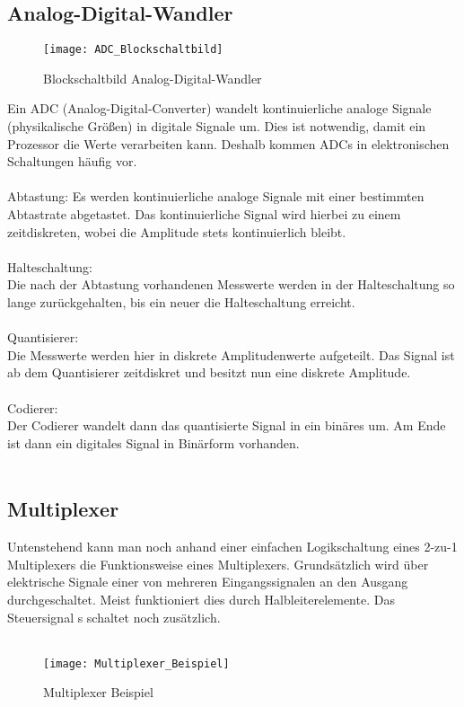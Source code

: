 \documentclass[titlepage,12pt,twoside]{article}
\begin{document}
\subsection{Analog-Digital-Wandler}
\label{chap:Analog-Digital-Wandler}
\begin{figure}[H]
	\begin{center}
		\scalebox{1.2}
		{\texttt{[image: ADC\_Blockschaltbild]}}
		\caption{Blockschaltbild Analog-Digital-Wandler}
		\label{fig:ADC_Blockschaltbild}
	\end{center}
\end{figure}
\hfill \break
Ein ADC (Analog-Digital-Converter) wandelt kontinuierliche analoge Signale 
(physikalische Größen) in digitale Signale um. Dies ist notwendig, damit ein 
Prozessor die Werte verarbeiten kann. Deshalb kommen ADCs in elektronischen 
Schaltungen häufig vor. \\
\\
Abtastung: Es werden kontinuierliche analoge Signale mit einer bestimmten 
Abtastrate abgetastet. Das kontinuierliche Signal wird hierbei zu einem 
zeitdiskreten, wobei die Amplitude stets kontinuierlich bleibt. \\
\\
Halteschaltung: \\
Die nach der Abtastung vorhandenen Messwerte werden in der Halteschaltung so 
lange zurückgehalten, bis ein neuer die Halteschaltung erreicht. \\
\\
Quantisierer: \\
Die Messwerte werden hier in diskrete Amplitudenwerte aufgeteilt. Das Signal 
ist ab dem Quantisierer zeitdiskret und besitzt nun eine diskrete Amplitude. \\
\\
Codierer: \\
Der Codierer wandelt dann das quantisierte Signal in ein binäres um. Am Ende ist 
dann ein digitales Signal in Binärform vorhanden. \\
\\

\subsection{Multiplexer}
\label{chap:Multiplexer}
Untenstehend kann man noch anhand einer einfachen Logikschaltung eines 2-zu-1 
Multiplexers die Funktionsweise eines Multiplexers. Grundsätzlich wird über elektrische 
Signale einer von mehreren Eingangssignalen an den Ausgang durchgeschaltet. Meist 
funktioniert dies durch Halbleiterelemente. Das Steuersignal s schaltet noch zusätzlich. \\
\\
\begin{figure}[H]
	\begin{center}
		\scalebox{1.2}
		{\texttt{[image: Multiplexer\_Beispiel]}}
		\caption{Multiplexer Beispiel}
		\label{fig:Multiplexer_Beispiel}
	\end{center}
\end{figure}
\hfill \break
\end{document}
